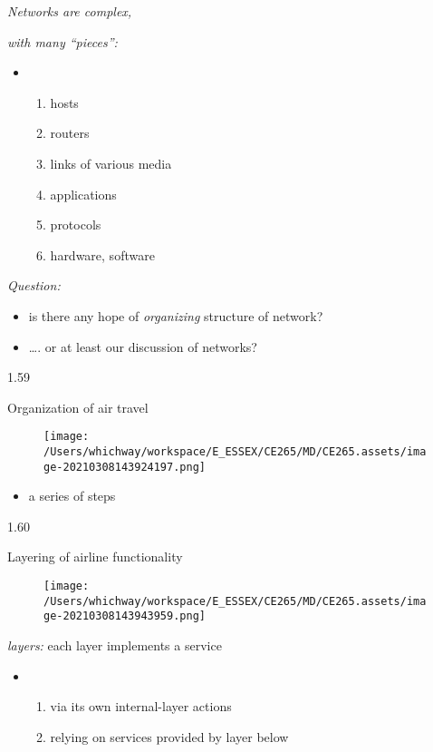\documentclass[
]{article}
\begin{document}
\emph{Networks are complex,}

\emph{with many ``pieces'':}

\begin{itemize}
\item
  \begin{enumerate}
  \def\labelenumi{\arabic{enumi}.}
  \item
    hosts
  \item
    routers
  \item
    links of various media
  \item
    applications
  \item
    protocols
  \item
    hardware, software
  \end{enumerate}
\end{itemize}

\emph{Question:}

\begin{itemize}
\item
  is there any hope of \emph{organizing} structure of network?
\end{itemize}

\begin{itemize}
\item
  \ldots. or at least our discussion of networks?
\end{itemize}

1.59

Organization of air travel

\begin{figure}
\centering
\texttt{[image: /Users/whichway/workspace/E\_ESSEX/CE265/MD/CE265.assets/image-20210308143924197.png]}
\caption{}
\end{figure}

\begin{itemize}
\item
  a series of steps
\end{itemize}

1.60

Layering of airline functionality

\begin{figure}
\centering
\texttt{[image: /Users/whichway/workspace/E\_ESSEX/CE265/MD/CE265.assets/image-20210308143943959.png]}
\caption{}
\end{figure}

\emph{layers:} each layer implements a service

\begin{itemize}
\item
  \begin{enumerate}
  \def\labelenumi{\arabic{enumi}.}
  \item
    via its own internal-layer actions
  \item
    relying on services provided by layer below
  \end{enumerate}
\end{itemize}
\end{document}
